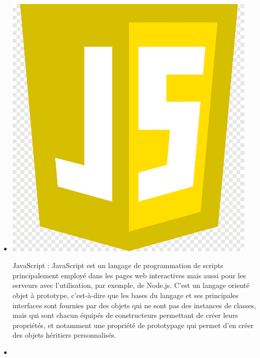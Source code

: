 \begin{itemize}
     
 	\item  \begin{minipage}{.10\textwidth}%
 		\includegraphics[width=0.95\textwidth]{D) IMAGES/java.png}
 	\end{minipage}%
 JavaScript : JavaScript est un langage de programmation de scripts principalement employé dans les pages web interactives mais aussi pour les serveurs avec l'utilisation, par exemple, de Node.js. C'est un langage orienté objet à prototype, c'est-à-dire que les bases du langage et ses principales interfaces sont fournies par des objets qui ne sont pas des instances de classes, mais qui sont chacun équipés de constructeurs permettant de créer leurs propriétés, et notamment une propriété de prototypage qui permet d'en créer des objets héritiers personnalisés.
 \item  \begin{minipage}{.15\textwidth}%

\end{minipage}
\end{itemize}
